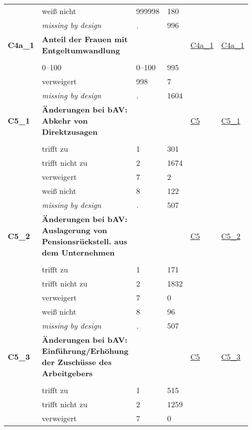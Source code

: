 \begin{longtable}{| L{2.45cm} | L{6cm} | C{1.5cm} | R{1cm} | C{2.25cm} | C{2.25cm} |}
   & weiß nicht & 999998 & 180 &  &  \\ 
   & \textit{missing by design} & \textit{.} & 996 &  &  \\ 
   \midrule
\textbf{C4a\_1}\label{var:C4a:1} & \textbf{Anteil der Frauen mit Entgeltumwandlung} &  &  & \hyperref[C4a:1]{C4a\_1} & \hyperref[var:suf:C4a:1]{C4a\_1} \\ 
   &  &  &  &  &  \\ 
   & 0--100 & 0--100 & 995 &  &  \\ 
   & verweigert & 998 & 7 &  &  \\ 
   & \textit{missing by design} & \textit{.} & 1604 &  &  \\ 
   \midrule
\textbf{C5\_1}\label{var:C5:1} & \textbf{Änderungen bei bAV: Abkehr von Direktzusagen} &  &  & \hyperref[C5]{C5} & \hyperref[var:suf:C5:1]{C5\_1} \\ 
   &  &  &  &  &  \\ 
   & trifft zu & 1 & 301 &  &  \\ 
   & trifft nicht zu & 2 & 1674 &  &  \\ 
   & verweigert & 7 & 2 &  &  \\ 
   & weiß nicht & 8 & 122 &  &  \\ 
   & \textit{missing by design} & \textit{.} & 507 &  &  \\ 
   \midrule
\textbf{C5\_2}\label{var:C5:2} & \textbf{Änderungen bei bAV: Auslagerung von Pensionsrückstell. aus dem Unternehmen} &  &  & \hyperref[C5]{C5} & \hyperref[var:suf:C5:2]{C5\_2} \\ 
   &  &  &  &  &  \\ 
   & trifft zu & 1 & 171 &  &  \\ 
   & trifft nicht zu & 2 & 1832 &  &  \\ 
   & verweigert & 7 & 0 &  &  \\ 
   & weiß nicht & 8 & 96 &  &  \\ 
   & \textit{missing by design} & \textit{.} & 507 &  &  \\ 
   \midrule
\textbf{C5\_3}\label{var:C5:3} & \textbf{Änderungen bei bAV: Einführung/Erhöhung der Zuschüsse des Arbeitgebers} &  &  & \hyperref[C5]{C5} & \hyperref[var:suf:C5:3]{C5\_3} \\ 
   &  &  &  &  &  \\ 
   & trifft zu & 1 & 515 &  &  \\ 
   & trifft nicht zu & 2 & 1259 &  &  \\ 
   & verweigert & 7 & 0 &  &  \\ 

\end{longtable}
